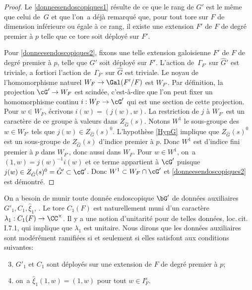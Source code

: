 \begin{proof}
Le \eqref{donneesendoscopiques1} résulte de ce que le rang de $G'$ est le même que celui de~$G$ et que l'on~a déjà remarqué que, pour tout tore sur $F$ de dimension inférieure ou égale à ce rang, il existe une extension $F'$ de $F$ de degré premier à $p$ telle que ce tore soit déployé sur $F'$.

Pour \eqref{donneesendoscopiques2}, fixons une telle extension galoisienne $F'$ de $F$ de degré premier à $p$, telle que $G'$ soit déployé sur $F'$. L'action de~$\Gamma_{F'}$ sur $\hat{G}'$ est triviale, a fortiori l'action de~$\Gamma_{F'}$ sur $\hat{G}$ est triviale. Le noyau de l'homomorphisme naturel $W_{F}\to \Gal(F'/F)$ est $W_{F'}$.
Par définition, la projection $\cG'\to W_{F}$ est scindée, c'est-à-dire que l'on peut fixer un homomorphisme continu $i:W_{F}\to \cG'$ qui est une section de cette projection. Pour $w\in W_{F}$, écrivons $i(w)=(j(w),w)$. La restriction de $j$ à $W_{F'}$ est un caractère de ce groupe à valeurs dans $Z_{\hat{G}}(s)$. Notons $W^1$ le sous-groupe des $w\in W_{F'}$ tels que $j(w)\in Z_{\hat{G}}(s)^0$. L'hypothèse \ref{HypG} implique que $Z_{\hat{G}}(s)^0$ est un sous-groupe de $Z_{\hat{G}}(s)$ d'indice premier à $p$. Donc $W^1$ est d'indice fini premier à $p$ dans $W_{F'}$, donc aussi dans $W_{F}$. Pour $w\in W^1$, on~a $(1,w)=j(w)^{-1}i(w)$ et ce terme appartient à $ \cG'$ puisque $j(w)\in Z_{\hat{G}}(s)^0=\hat{G}'\subset \cG'$. Donc $W^1\subset W_{F}\cap \cG'$ et \eqref{donneesendoscopiques2} est démontré.
\end{proof}

On a besoin de munir toute donnée endoscopique $\bG'$ de données auxiliaires $G'_{1},C_{1},\hat{\xi}_{1}$, \cf \cite[I.2.1]{MW}. Le tore $C_{1}(F)$ est naturellement muni d'un caractère $\lambda_{1}:C_{1}(F)\to \CC^{\times}$. Il y a une notion d'unitarité pour de telles données, \cf loc.\,cit.\,I.7.1, qui implique que $\lambda_{1}$ est unitaire.
Nous dirons que les données auxiliaires sont modérément ramifiées si et seulement si elles satisfont aux conditions suivantes:
\begin{enumerate}\setcounter{enumi}{2}
\item\label{donneesendoscopiques3}
$G'_{1}$ et $C_{1}$ sont déployés sur une extension de $F$ de degré premier à $p$;

\item\label{donneesendoscopiques4}
on~a $\hat{\xi}_{1}(1,w)=(1,w)$ pour tout $w\in I_{F}^s$.
\end{enumerate}

